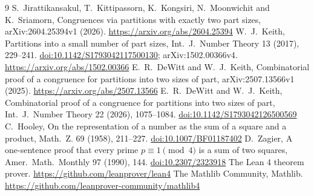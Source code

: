 \documentclass[11pt]{article}
\theoremstyle{remark}
\begin{document}
\begin{thebibliography}{9}
 S.~Jirattikansakul, T.~Kittipassorn, K.~Kongsiri, N.~Moonwichit and K.~Sriamorn, Congruences via partitions with exactly two part sizes, arXiv:2604.25394v1 (2026). \url{https://arxiv.org/abs/2604.25394}
 W.~J.~Keith, Partitions into a small number of part sizes, Int.~J.~Number Theory 13 (2017), 229--241. \href{https://doi.org/10.1142/S1793042117500130}{doi:10.1142/S1793042117500130}; arXiv:1502.00366v4. \url{https://arxiv.org/abs/1502.00366}
 E.~R.~DeWitt and W.~J.~Keith, Combinatorial proof of a congruence for partitions into two sizes of part, arXiv:2507.13566v1 (2025). \url{https://arxiv.org/abs/2507.13566}
 E.~R.~DeWitt and W.~J.~Keith, Combinatorial proof of a congruence for partitions into two sizes of part, Int.~J.~Number Theory 22 (2026), 1075--1084. \href{https://doi.org/10.1142/S1793042126500569}{doi:10.1142/S1793042126500569}
 C.~Hooley, On the representation of a number as the sum of a square and a product, Math.~Z. 69 (1958), 211--227. \href{https://doi.org/10.1007/BF01187402}{doi:10.1007/BF01187402}
 D.~Zagier, A one-sentence proof that every prime $p\equiv 1\pmod 4$ is a sum of two squares, Amer.~Math.~Monthly 97 (1990), 144. \href{https://doi.org/10.2307/2323918}{doi:10.2307/2323918}
 The Lean 4 theorem prover. \url{https://github.com/leanprover/lean4}
 The Mathlib Community, Mathlib. \url{https://github.com/leanprover-community/mathlib4}
\end{thebibliography}
\end{document}
